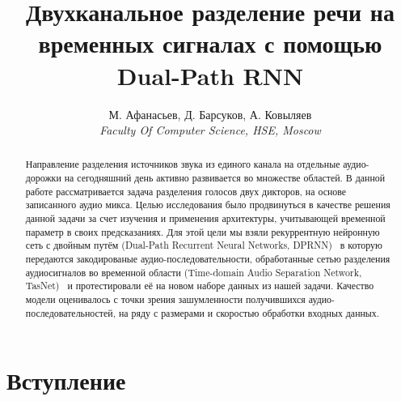 \documentclass[10pt,conference,compsocconf]{IEEEtran}
\begin{document}
\title{Двухканальное разделение речи на временных сигналах с помощью Dual-Path RNN
}

\author{
  М. Афанасьев, Д. Барсуков, А. Ковыляев\\
  \textit{Faculty Of Computer Science, HSE, Moscow}\\ 
}

\maketitle

\begin{abstract}
Направление разделения источников звука из единого канала на отдельные аудио-дорожки на сегодняшний день активно развивается во множестве областей. В данной работе рассматривается задача разделения голосов двух дикторов, на основе записанного аудио микса. Целью исследования было продвинуться в качестве решения данной задачи за счет изучения и применения архитектуры, учитывающей временной параметр в своих предсказаниях. Для этой цели мы взяли рекуррентную нейронную сеть с двойным путём (Dual-Path Recurrent Neural Networks, DPRNN)~\cite{luo_dprnn} в которую передаются закодированые аудио-последовательности, обработанные сетью разделения аудиосигналов во временной области (Time-domain Audio Separation Network, TasNet)~\cite{luo_tasnet} и протестировали её на новом наборе данных из нашей задачи. Качество модели оценивалось с точки зрения зашумленности получившихся аудио-последовательностей, на ряду с размерами и скоростью обработки входных данных. 

\end{abstract}

\section{Вступление}
\end{document}
